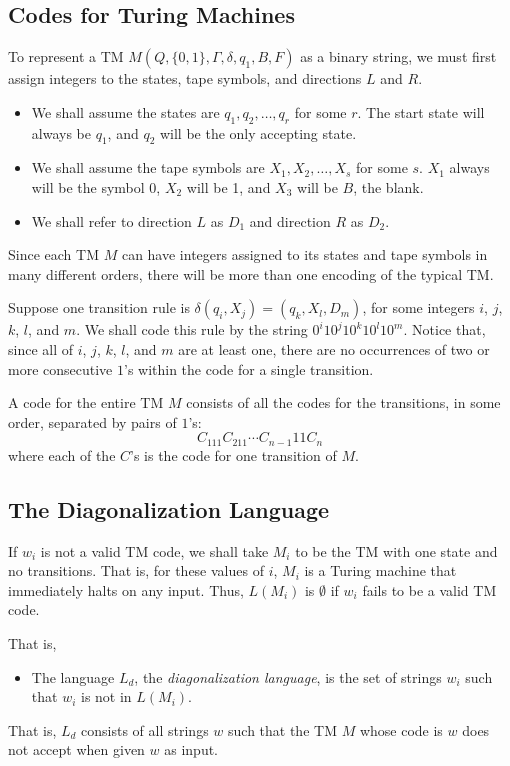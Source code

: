 \documentclass[]{article}
\begin{document}
\subsection*{Codes for Turing Machines}
To represent a TM $M (Q, \{0,1\}, \Gamma, \delta, q_1, B, F)$ as a binary
string, we must first assign integers to the states, tape symbols, and
directions $L$ and $R$.
\begin{itemize}
\item We shall assume the states are $q_1,q_2,\ldots,q_r$ for some $r$. The
start state will always be $q_1$, and $q_2$ will be the only accepting state.
\item We shall assume the tape symbols are $X_1,X_2,\ldots,X_s$ for some $s$.
$X_1$ always will be the symbol 0, $X_2$ will be 1, and $X_3$ will be $B$, the
blank.
\item We shall refer to direction $L$ as $D_1$ and direction $R$ as $D_2$.
\end{itemize}
Since each TM $M$ can have integers assigned to its states and tape symbols in
many different orders, there will be more than one encoding of the typical TM.

Suppose one transition rule is $\delta(q_i, X_j) = (q_k, X_l, D_m)$, for some
integers $i$, $j$, $k$, $l$, and $m$.  We shall code this rule by the string
$0^i10^j10^k10^l10^m$. Notice that, since all of $i$, $j$, $k$, $l$, and $m$ are
at least one, there are no occurrences of two or more consecutive $1$'s within
the code for a single transition.

A code for the entire TM $M$ consists of all the codes for the transitions, in
some order, separated by pairs of $1$'s:
\[ C_111C_211\cdots{C_{n-1}}11C_n \]
where each of the $C$'s is the code for one transition of $M$.

\subsection*{The Diagonalization Language}
If $w_i$ is not a valid TM code, we shall take $M_i$ to be the TM with one state
and no transitions. That is, for these values of $i$, $M_i$ is a Turing machine
that immediately halts on any input. Thus, $L(M_i)$ is $\emptyset$ if $w_i$
fails to be a valid TM code.

That is,
\begin{itemize}
\item The language $L_d$, the \emph{diagonalization language}, is the set of
strings $w_i$ such that $w_i$ is not in $L(M_i)$.
\end{itemize}
That is, $L_d$ consists of all strings $w$ such that the TM $M$ whose code is
$w$ does not accept when given $w$ as input.
\end{document}
